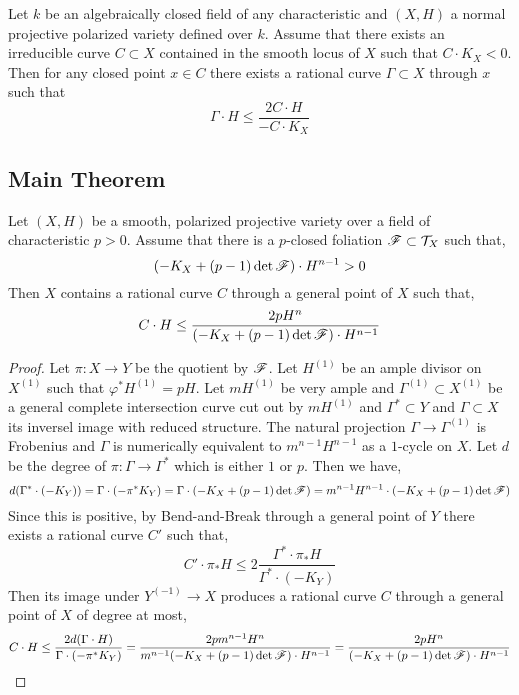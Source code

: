 \documentclass[12pt]{article}
\begin{document}
\begin{theorem}
Let $k$ be an algebraically closed field of any characteristic and $(X, H)$ a normal projective polarized variety defined over $k$. Assume that there exists an irreducible curve $C \subset X$ contained in the smooth locus of $X$ such that $C \cdot K_X < 0$. Then for any closed point $x \in C$ there exists a rational curve $\Gamma \subset X$ through $x$ such that 
\[ \Gamma \cdot H \le \frac{2 C \cdot H}{- C \cdot K_X} \]
\end{theorem}

\subsection{Main Theorem}

\begin{theorem}
Let $(X, H)$ be a smooth, polarized projective variety over a field of characteristic $p > 0$. Assume that there is a $p$-closed foliation $\mathscr{F} \subset \mathcal{T}_X$ such that,
\[ (-K_X + (p-1) \det{\mathscr{F}}) \cdot H^{n-1} > 0 \]
Then $X$ contains a rational curve $C$ through a general point of $X$ such that,
\[ C \cdot H \le \frac{2 p H^n}{(-K_X + (p-1) \det{\mathscr{F}}) \cdot H^{n-1}} \]
\end{theorem}

\begin{proof}
Let $\pi : X \to Y$ be the quotient by $\mathscr{F}$. Let $H^{(1)}$ be an ample divisor on $X^{(1)}$ such that $\varphi^* H^{(1)} = p H$. Let $m H^{(1)}$ be very ample and $\Gamma^{(1)} \subset X^{(1)}$ be a general complete intersection curve cut out by $m H^{(1)}$ and $\Gamma^* \subset Y$ and $\Gamma \subset X$ its inversel image with reduced structure. The natural projection $\Gamma \to \Gamma^{(1)}$ is Frobenius and $\Gamma$ is numerically equivalent to $m^{n-1} H^{n-1}$ as a $1$-cycle on $X$. Let $d$ be the degree of $\pi : \Gamma \to \Gamma^*$ which is either $1$ or $p$. Then we have,
\[ d (\Gamma^* \cdot (-K_Y)) = \Gamma \cdot (-\pi^*K_Y) = \Gamma \cdot (-K_X + (p-1) \det{\mathscr{F}}) = m^{n-1} H^{n-1} \cdot (-K_X + (p-1) \det{\mathscr{F}}) \]
Since this is positive, by Bend-and-Break through a general point of $Y$ there exists a rational curve $C'$ such that,
\[ C' \cdot \pi_* H \le 2 \frac{\Gamma^* \cdot \pi_* H}{\Gamma^* \cdot (-K_Y)} \]
Then its image under $Y^{(-1)} \to X$ produces a rational curve $C$ through a general point of $X$ of degree at most,
\[ C \cdot H \le \frac{2d(\Gamma \cdot H)}{\Gamma \cdot (-\pi^* K_Y)} = \frac{2 p m^{n-1} H^n}{m^{n-1} (-K_X + (p-1) \det{\mathscr{F}}) \cdot H^{n-1}} = \frac{2 p H^n}{(-K_X + (p-1) \det{\mathscr{F}}) \cdot H^{n-1}} \]
\end{proof}
\end{document}
